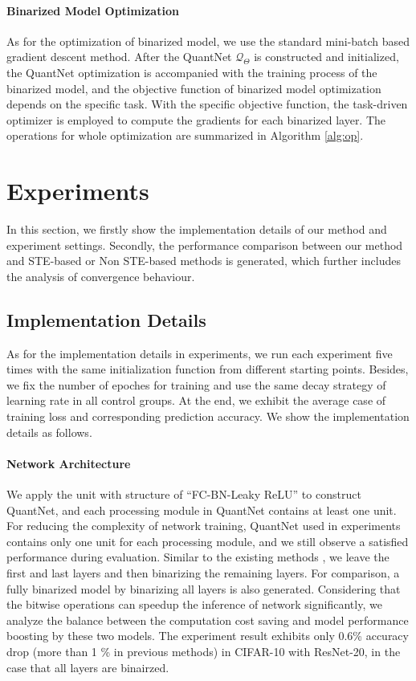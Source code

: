 \documentclass[runningheads]{llncs}
\begin{document}
\paragraph{\textbf{Binarized Model Optimization}}
As for the optimization of binarized model,
we use the standard mini-batch based gradient descent method.
After the QuantNet $\mathcal{Q}_{\Theta}$ is constructed and initialized,
the QuantNet optimization is accompanied with the training process of the binarized model,
and the objective function of binarized model optimization depends on the specific task.
With the specific objective function,
the task-driven optimizer is employed to compute the gradients for each binarized layer.
The operations for whole optimization are summarized in Algorithm \ref{alg:op}.

\section{Experiments}
In this section, we firstly show the implementation details of our method and experiment settings.
Secondly, the performance comparison between our method and STE-based or Non STE-based methods is generated,
which further includes the analysis of convergence behaviour.

\subsection{Implementation Details}
As for the implementation details in experiments,
we run each experiment five times with the same initialization function from different starting points.
Besides, we fix the number of epoches for training and
use the same decay strategy of learning rate in all control groups.
At the end, we exhibit the average case of training loss and corresponding prediction accuracy.
We show the implementation details as follows.

\paragraph{\textbf{Network Architecture}}
We apply the unit with structure of ``FC-BN-Leaky ReLU'' to construct QuantNet,
and each processing module in QuantNet contains at least one unit.
For reducing the complexity of network training,
QuantNet used in experiments contains only one unit for each processing module,
and we still observe a satisfied performance during evaluation.
Similar to the existing methods \cite{rastegari2016xnor,Zhang2018LQ,Uhlich2019DQ},
we leave the first and last layers and then binarizing the remaining layers.
For comparison, a fully binarized model by binarizing all layers is also generated.
Considering that the bitwise operations can speedup the inference of network significantly,
we analyze the balance between the computation cost saving and model performance boosting by these two models.
The experiment result exhibits only 0.6\% accuracy drop (more than 1 \% in previous methods)
in CIFAR-10 \cite{cifar10} with ResNet-20, in the case that all layers are binairzed.
\end{document}
